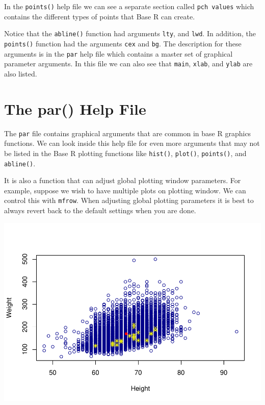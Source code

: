\documentclass[
]{book}
\newenvironment{Shaded}{\begin{snugshade}}{\end{snugshade}}
\newcommand{\CommentTok}[1]{\textcolor[rgb]{0.56,0.35,0.01}{\textit{#1}}}
\newcommand{\DataTypeTok}[1]{\textcolor[rgb]{0.13,0.29,0.53}{#1}}
\newcommand{\DecValTok}[1]{\textcolor[rgb]{0.00,0.00,0.81}{#1}}
\newcommand{\KeywordTok}[1]{\textcolor[rgb]{0.13,0.29,0.53}{\textbf{#1}}}
\newcommand{\NormalTok}[1]{#1}
\newcommand{\OperatorTok}[1]{\textcolor[rgb]{0.81,0.36,0.00}{\textbf{#1}}}
\begin{document}
In the \texttt{points()} help file we can see a separate section called \texttt{pch\ values} which contains the different types of points that Base R can create.

Notice that the \texttt{abline()} function had arguments \texttt{lty}, and \texttt{lwd}. In addition, the \texttt{points()} function had the arguments \texttt{cex} and \texttt{bg}. The description for these arguments is in the \texttt{par} help file which contains a master set of graphical parameter arguments. In this file we can also see that \texttt{main}, \texttt{xlab}, and \texttt{ylab} are also listed.

\hypertarget{the-par-help-file}{%
\section{The par() Help File}\label{the-par-help-file}}

The \texttt{par} file contains graphical arguments that are common in base R graphics functions. We can look inside this help file for even more arguments that may not be listed in the Base R plotting functions like \texttt{hist()}, \texttt{plot()}, \texttt{points()}, and \texttt{abline()}.

It is also a function that can adjust global plotting window parameters. For example, suppose we wish to have multiple plots on plotting window. We can control this with \texttt{mfrow}. When adjusting global plotting parameters it is best to always revert back to the default settings when you are done.

\begin{Shaded}
\end{Shaded}

\includegraphics{_main_files/figure-latex/unnamed-chunk-189-1.pdf}
\end{document}
